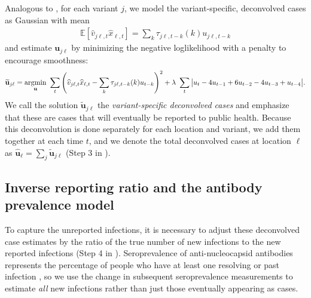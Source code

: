 Analogous to
, for each variant $j$, we model
the variant-specific, deconvolved cases as Gaussian with mean
\begin{align}
  \mathbb{E}\left[\widehat{v}_{j\ell,t}\widehat{x}_{\ell,t}\right] = \sum_k \tau_{j\ell,t-k}(k) u_{j\ell,t-k} 
\end{align}
and estimate $\mathbf{u}_{j\ell}$ by minimizing the negative loglikelihood with
a penalty to encourage smoothness:
\begin{align}
\widetilde{\mathbf{u}}_{j\ell} = \operatorname*{argmin}_{\mathbf{u}}\ \sum_{t} 
\left( 
    \widehat{v}_{j\ell,t} \widehat{x}_{\ell,t} -  
    \sum_k \tau_{j\ell,t-k}(k) u_{t-k} 
\right)^2 
+ \lambda\ \sum_{t} \big|u_{t} - 4u_{t-1} + 6u_{t-2} -4u_{t-3}+ u_{t-4}\big|.
\end{align}
We call the solution $\widetilde{\mathbf{u}}_{j\ell}$ the \emph{variant-specific
deconvolved cases} and emphasize that these are cases that will eventually
be reported to public health. Because this deconvolution is done separately for
each location and variant, we add them together at each time $t$, and
we denote the total deconvolved cases at location $\ell$ as
$\widehat{\mathbf{u}}_\ell = \sum_j \widetilde{\mathbf{u}}_{j\ell}$ (Step 3 in ). 




\subsection{Inverse reporting ratio and the antibody prevalence model} 
\label{sec:report-ratio}

To capture the unreported infections, it is necessary to adjust these
deconvolved case estimates by the ratio of the true number of new infections to
the new reported infections (Step 4 in ). 
Seroprevalence of anti-nucleocapsid antibodies represents the percentage
of people who have at least one resolving or past infection \citep{cdc2020data},
so we use the change in subsequent seroprevalence measurements to estimate
\emph{all} new infections rather than just those eventually appearing as cases.

